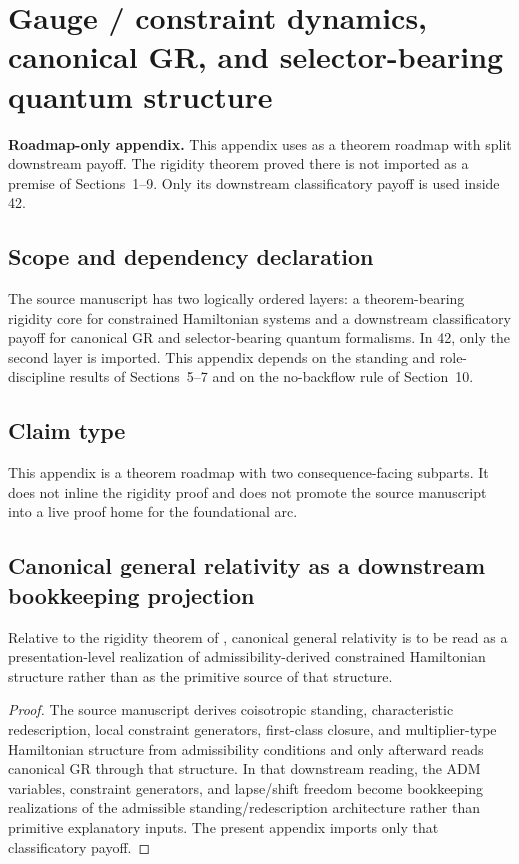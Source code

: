 \section{Gauge / constraint dynamics, canonical GR, and selector-bearing quantum structure}
\label{app:gauge-qm}

\begin{fixedbox}
\textbf{Roadmap-only appendix.} This appendix uses \gaugeconstraintdoc{} as a theorem roadmap with split downstream payoff. The rigidity theorem proved there is not imported as a premise of Sections~1--9. Only its downstream classificatory payoff is used inside 42.
\end{fixedbox}

\subsection*{Scope and dependency declaration}
The source manuscript has two logically ordered layers: a theorem-bearing rigidity core for constrained Hamiltonian systems and a downstream classificatory payoff for canonical GR and selector-bearing quantum formalisms. In 42, only the second layer is imported. This appendix depends on the standing and role-discipline results of Sections~5--7 and on the no-backflow rule of Section~10.

\subsection*{Claim type}
This appendix is a theorem roadmap with two consequence-facing subparts. It does not inline the rigidity proof and does not promote the source manuscript into a live proof home for the foundational arc.

\subsection*{Canonical general relativity as a downstream bookkeeping projection}

\begin{proposition}
Relative to the rigidity theorem of \gaugeconstraintdoc{}, canonical general relativity is to be read as a presentation-level realization of admissibility-derived constrained Hamiltonian structure rather than as the primitive source of that structure.
\end{proposition}

\begin{proof}
The source manuscript derives coisotropic standing, characteristic redescription, local constraint generators, first-class closure, and multiplier-type Hamiltonian structure from admissibility conditions and only afterward reads canonical GR through that structure. In that downstream reading, the ADM variables, constraint generators, and lapse/shift freedom become bookkeeping realizations of the admissible standing/redescription architecture rather than primitive explanatory inputs. The present appendix imports only that classificatory payoff.\cite{MaleyGaugeConstraintDynamics}
\end{proof}

